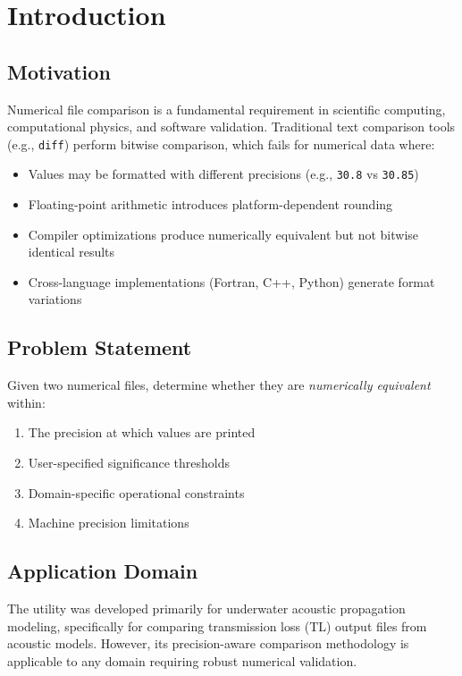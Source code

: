 \section{Introduction}
\label{sec:introduction}

\subsection{Motivation}

Numerical file comparison is a fundamental requirement in scientific computing, computational physics, and software validation. Traditional text comparison tools (e.g., \texttt{diff}) perform bitwise comparison, which fails for numerical data where:

\begin{itemize}
    \item Values may be formatted with different precisions (e.g., \texttt{30.8} vs \texttt{30.85})
    \item Floating-point arithmetic introduces platform-dependent rounding
    \item Compiler optimizations produce numerically equivalent but not bitwise identical results
    \item Cross-language implementations (Fortran, C++, Python) generate format variations
\end{itemize}

\subsection{Problem Statement}

Given two numerical files, determine whether they are \emph{numerically equivalent} within:
\begin{enumerate}
    \item The precision at which values are printed
    \item User-specified significance thresholds
    \item Domain-specific operational constraints
    \item Machine precision limitations
\end{enumerate}

\subsection{Application Domain}

The \ubdiff{} utility was developed primarily for underwater acoustic propagation modeling, specifically for comparing transmission loss (TL) output files from acoustic models. However, its precision-aware comparison methodology is applicable to any domain requiring robust numerical validation.

